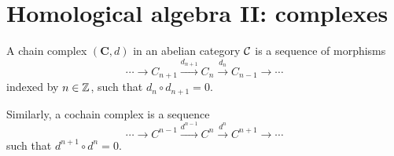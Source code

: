 




\section{Homological algebra II: complexes}

\begin{defn}
    A chain complex $(\bm{C},d)$ in an abelian category $\mathcal{C}$ is a sequence  of morphisms 
    \[\cdots\to C_{n+1}\overset{d_{n+1}}\to C_n\overset{d_n}\to C_{n-1}\to\cdots\]
    indexed by $n\in \mathbb{Z}$, such that $d_n\circ d_{n+1}=0$.
    
    Similarly, a cochain complex is a sequence
    \[\cdots\to C^{n-1}\overset{d^{n-1}}\to C^n\overset{d^n}\to C^{n+1}\to\cdots\]
    such that $d^{n+1}\circ d^n=0$.
\end{defn}

